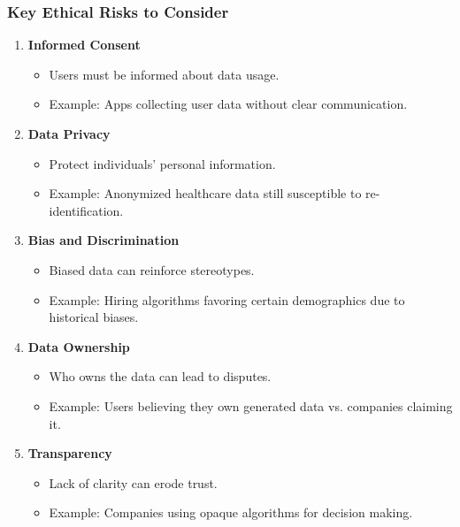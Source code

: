 \documentclass{beamer}
\begin{document}
\begin{frame}[fragile]
    \frametitle{Key Ethical Risks to Consider}
    \begin{enumerate}
        \item \textbf{Informed Consent}
            \begin{itemize}
                \item Users must be informed about data usage.
                \item Example: Apps collecting user data without clear communication.
            \end{itemize}
        \item \textbf{Data Privacy}
            \begin{itemize}
                \item Protect individuals' personal information.
                \item Example: Anonymized healthcare data still susceptible to re-identification.
            \end{itemize}
        \item \textbf{Bias and Discrimination}
            \begin{itemize}
                \item Biased data can reinforce stereotypes.
                \item Example: Hiring algorithms favoring certain demographics due to historical biases.
            \end{itemize}
        \item \textbf{Data Ownership}
            \begin{itemize}
                \item Who owns the data can lead to disputes.
                \item Example: Users believing they own generated data vs. companies claiming it.
            \end{itemize}
        \item \textbf{Transparency}
            \begin{itemize}
                \item Lack of clarity can erode trust.
                \item Example: Companies using opaque algorithms for decision making.
            \end{itemize}
    \end{enumerate}
\end{frame}
\end{document}
